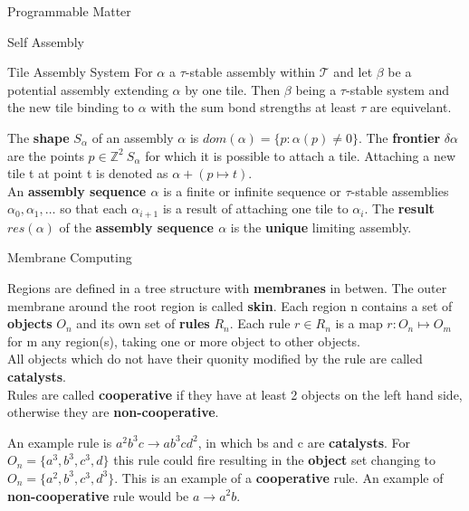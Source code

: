 \documentclass[12pt, letterpaper]{article}
\begin{document}
\begin{section}{Programmable Matter}
\begin{subsection}{Self Assembly}
\begin{subsubsection}{Tile Assembly System}
      For \(\alpha\) a \(\tau\)-stable assembly within \(\mathcal{T}\) and let
      \(\beta\) be a potential assembly extending \(\alpha\) by one tile. Then
      \(\beta\) being a \(\tau\)-stable system and the new tile binding to
      \(\alpha\) with the sum bond strengths at least \(\tau\) are equivelant.

      The \textbf{shape} \(S_{\alpha}\) of an assembly \(\alpha\) is
      \(dom(\alpha) = \{ p: \alpha(p) \neq 0 \}\). The \textbf{frontier}
      \(\delta \alpha\) are the points \(p \in \mathbb{Z}^{2} \ S_{\alpha}\)
      for which it is possible to attach a tile. Attaching a new tile t at
      point t is denoted as \(\alpha + (p \mapsto t)\). \\
      An \textbf{assembly sequence \(\alpha\)} is a finite or infinite sequence
      or \(\tau\)-stable assemblies \(\alpha_{0}, \alpha_{1}, \dots\) so that
      each \(\alpha_{i + 1}\) is a result of attaching one tile to
      \(\alpha_{i}\). The \textbf{result \(res(\alpha)\)} of the
      \textbf{assembly sequence \(\alpha\)} is the \textbf{unique} limiting
      assembly.

    \end{subsubsection}

  \end{subsection}

  \newpage

  \begin{subsection}{Membrane Computing}

    Regions are defined in a tree structure with \textbf{membranes} in betwen.
    The outer membrane around the root region is called \textbf{skin}.
    Each region n contains a set of \textbf{objects} \(O_{n}\) and its own set
    of \textbf{rules} \(R_{n}\). Each rule \(r \in R_{n}\) is a map \(r: O_{n}
    \mapsto O_{m}\) for m any region(s), taking one or more object to other
    objects. \\
    All objects which do not have their quonity modified by the rule are called
    \textbf{catalysts}. \\
    Rules are called \textbf{cooperative} if they have at least 2 objects on
    the left hand side, otherwise they are \textbf{non-cooperative}.

    An example rule is \(a^{2}b^{3}c \to ab^{3}cd^{2}\), in which bs and c are
    \textbf{catalysts}. For \(O_{n} = \{ a^{3}, b^{3}, c^{3}, d \}\) this rule
    could fire resulting in the \textbf{object} set changing to \(O_{n} =
    \{ a^{2}, b^{3}, c^{3}, d^{3} \}\). This is an example of a
    \textbf{cooperative} rule. An example of \textbf{non-cooperative} rule
    would be \(a \to a^{2}b\).


\end{subsection}
\end{section}
\end{document}
